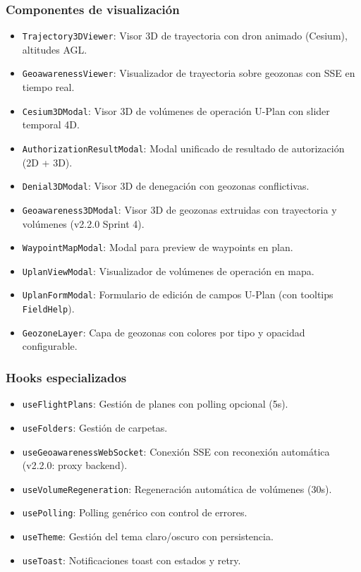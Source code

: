 \documentclass[12pt,a4paper]{article}
\begin{document}
\subsubsection*{Componentes de visualización}
\begin{itemize}
    \item \texttt{Trajectory3DViewer}: Visor 3D de trayectoria con dron animado (Cesium), altitudes AGL.
    \item \texttt{GeoawarenessViewer}: Visualizador de trayectoria sobre geozonas con SSE en tiempo real.
    \item \texttt{Cesium3DModal}: Visor 3D de volúmenes de operación U-Plan con slider temporal 4D.
    \item \texttt{AuthorizationResultModal}: Modal unificado de resultado de autorización (2D + 3D).
    \item \texttt{Denial3DModal}: Visor 3D de denegación con geozonas conflictivas.
    \item \texttt{Geoawareness3DModal}: Visor 3D de geozonas extruidas con trayectoria y volúmenes (v2.2.0 Sprint 4).
    \item \texttt{WaypointMapModal}: Modal para preview de waypoints en plan.
    \item \texttt{UplanViewModal}: Visualizador de volúmenes de operación en mapa.
    \item \texttt{UplanFormModal}: Formulario de edición de campos U-Plan (con tooltips \texttt{FieldHelp}).
    \item \texttt{GeozoneLayer}: Capa de geozonas con colores por tipo y opacidad configurable.
\end{itemize}

\subsubsection*{Hooks especializados}
\begin{itemize}
    \item \texttt{useFlightPlans}: Gestión de planes con polling opcional (5s).
    \item \texttt{useFolders}: Gestión de carpetas.
    \item \texttt{useGeoawarenessWebSocket}: Conexión SSE con reconexión automática (v2.2.0: proxy backend).
    \item \texttt{useVolumeRegeneration}: Regeneración automática de volúmenes (30s).
    \item \texttt{usePolling}: Polling genérico con control de errores.
    \item \texttt{useTheme}: Gestión del tema claro/oscuro con persistencia.
    \item \texttt{useToast}: Notificaciones toast con estados y retry.
\end{itemize}
\end{document}
